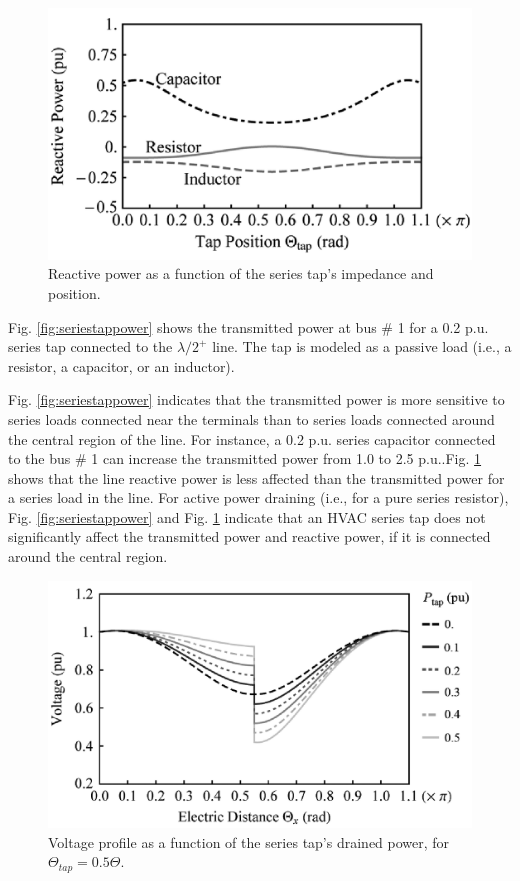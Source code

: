 \documentclass[12pt,a4paper]{reportmod}
\begin{document}
\begin{figure}[h]
\label{fig:seriestaprepower}
\begin{center}
\includegraphics[scale=0.3]{seriestaprepower.png}
\caption{Reactive power as a function of the series tap’s impedance and position.}
\end{center}
\end{figure}
\par Fig. \ref{fig:seriestappower} shows the transmitted power at bus \# 1 for a 0.2 p.u. series tap connected to the $\lambda /2^+$ line. The tap is modeled as a passive load (i.e., a resistor, a capacitor, or an inductor).
\par Fig. \ref{fig:seriestappower} indicates that the transmitted power is more sensitive to series loads connected near the terminals than to series loads connected around the central region of the line. For instance, a 0.2 p.u. series capacitor connected to the bus \# 1 can increase the transmitted power from 1.0 to 2.5 p.u..Fig. \ref{fig:seriestaprepower} shows that the line reactive power is less affected than the transmitted power for a series load in the line. For active power draining (i.e., for a pure series resistor), Fig. \ref{fig:seriestappower} and Fig. \ref{fig:seriestaprepower} indicate that an HVAC series tap does not significantly affect the transmitted power and reactive power, if it is connected around the central region.
\begin{figure}[h]
\label{fig:seriestapvpdp}
\begin{center}
\includegraphics[scale=0.3]{seriestapvpdp.png}
\caption{Voltage profile as a function of the series tap’s drained power, for $\Theta_{tap}=0.5\Theta$.}
\end{center}
\end{figure}
\end{document}
